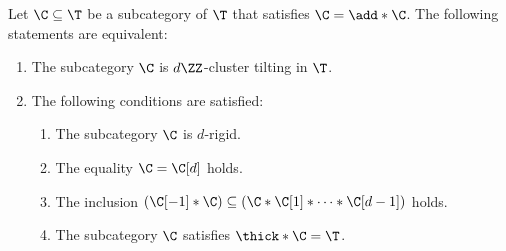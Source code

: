 \documentclass[a4paper]{amsart}
\begin{document}
\begin{theorem}
  \label{thm:dZ-ct_characterisation}
  Let $\C\subseteq\T$ be a subcategory of $\T$ that satisfies $\C=\add*{\C}$.
  The following statements are equivalent:
  \begin{enumerate}
  \item\label{it:dZ-CT} The subcategory $\C$ is $d\ZZ$-cluster tilting in $\T$.
  \item\label{it:weak_ang_subcat} The following conditions are satisfied:
    \begin{enumerate}
    \item\label{itit:d-rigid} The subcategory $\C$ is $d$-rigid.
    \item\label{itit:d-stable} The equality $\C=\C[d]$ holds.
    \item\label{itit:new_inclusion} The inclusion
      $(\C[-1]*\C)\subseteq(\C*\C[1]*\cdots*\C[d-1])$ holds.
    \item\label{itit:thick} The subcategory $\C$ satisfies $\thick*{\C}=\T$.
    \end{enumerate}
  \end{enumerate}
\end{theorem}
\end{document}
